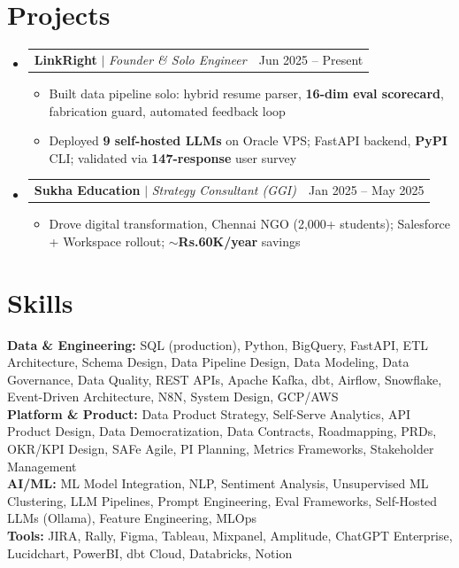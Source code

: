 \documentclass[a4paper,10pt]{article}
\makeatletter
\newcommand{\resumeItem}[1]{
  \item\small{#1\vspace{-2pt}}
}
\newcommand{\resumeProjectHeading}[2]{
  \item
  \begin{tabular*}{0.97\textwidth}{l@{\extracolsep{\fill}}r}
    \small#1 & #2 \\
  \end{tabular*}\vspace{-7pt}
}
\newcommand{\resumeSubHeadingListStart}{\begin{itemize}[leftmargin=0.15in, label={}]}
\newcommand{\resumeSubHeadingListEnd}{\end{itemize}}
\newcommand{\resumeItemListStart}{\begin{itemize}\parfillskip=0pt}
\newcommand{\resumeItemListEnd}{\end{itemize}\vspace{-5pt}}
\makeatother
\begin{document}
\section{Projects}
\resumeSubHeadingListStart

  \resumeProjectHeading
    {\textbf{LinkRight} $|$ \emph{Founder \& Solo Engineer}}{Jun 2025 -- Present}
  \resumeItemListStart
    \resumeItem{Built data pipeline solo: hybrid resume parser, \textbf{16-dim eval scorecard}, fabrication guard, automated feedback loop}
    \resumeItem{Deployed \textbf{9 self-hosted LLMs} on Oracle VPS; FastAPI backend, \textbf{PyPI} CLI; validated via \textbf{147-response} user survey}
  \resumeItemListEnd

  \resumeProjectHeading
    {\textbf{Sukha Education} $|$ \emph{Strategy Consultant (GGI)}}{Jan 2025 -- May 2025}
  \resumeItemListStart
    \resumeItem{Drove digital transformation, Chennai NGO (2,000+ students); Salesforce + Workspace rollout; \textbf{$\sim$Rs.60K/year} savings}
  \resumeItemListEnd

\resumeSubHeadingListEnd

\section{Skills}
\begin{itemize}[leftmargin=0.15in, label={}]
  \small{\item{
    \textbf{Data \& Engineering:}{ SQL (production), Python, BigQuery, FastAPI, ETL Architecture, Schema Design, Data Pipeline Design, Data Modeling, Data Governance, Data Quality, REST APIs, Apache Kafka, dbt, Airflow, Snowflake, Event-Driven Architecture, N8N, System Design, GCP/AWS} \\
    \textbf{Platform \& Product:}{ Data Product Strategy, Self-Serve Analytics, API Product Design, Data Democratization, Data Contracts, Roadmapping, PRDs, OKR/KPI Design, SAFe Agile, PI Planning, Metrics Frameworks, Stakeholder Management} \\
    \textbf{AI/ML:}{ ML Model Integration, NLP, Sentiment Analysis, Unsupervised ML Clustering, LLM Pipelines, Prompt Engineering, Eval Frameworks, Self-Hosted LLMs (Ollama), Feature Engineering, MLOps} \\
    \textbf{Tools:}{ JIRA, Rally, Figma, Tableau, Mixpanel, Amplitude, ChatGPT Enterprise, Lucidchart, PowerBI, dbt Cloud, Databricks, Notion}
  }}
\end{itemize}

\end{document}
